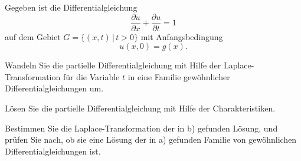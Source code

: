 Gegeben ist die Differentialgleichung
\[
\frac{\partial u}{\partial x}+\frac{\partial u}{\partial t}=1
\]
auf dem Gebiet $G=\{ (x,t)\,|\,t>0\}$ mit Anfangsbedingung
\[
u(x,0)=g(x).
\]
\begin{teilaufgaben}
\item
Wandeln Sie die partielle Differentialgleichung mit Hilfe der
Laplace-Transformation für die Variable $t$ in eine Familie
gewöhnlicher Differentialgleichungen um.
\item
Lösen Sie die partielle Differentialgleichung mit Hilfe der Charakteristiken.
\item 
Bestimmen Sie die Laplace-Transformation der in b) gefunden Lösung, und
prüfen Sie nach, ob sie eine Lösung der in a) gefunden Familie von
gewöhnlichen Differentialgleichungen ist.
\end{teilaufgaben}

